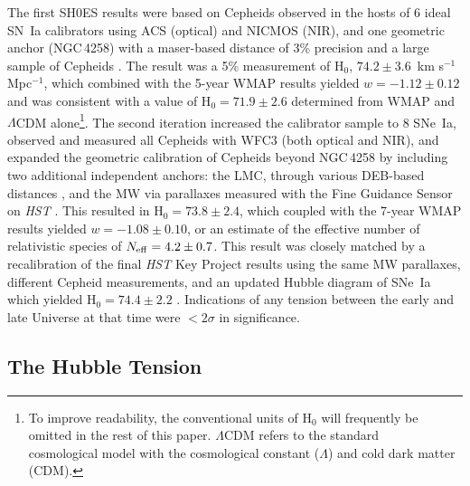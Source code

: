 \documentclass[12pt]{aastex631}
\newcommand{\kms}{km s$^{-1}$ Mpc$^{-1}$}
\begin{document}
The first SH0ES results \citep[][hereafter R09]{riess09a} were based on Cepheids observed in the hosts of 6 ideal SN~Ia calibrators using ACS (optical) and NICMOS (NIR), and one geometric anchor (NGC$\,$4258) with a maser-based distance of 3\% precision \citep{Humphreys13} and a large sample of Cepheids \citep{macri06}.  The result was a 5\% measurement of H$_0$, $74.2\pm3.6$~\kms, which combined with the 5-year WMAP results \citep{Komatsu:2009} yielded $w=-1.12\pm0.12$ and was consistent with a value of H$_0=71.9\pm2.6$ determined from WMAP and $\Lambda$CDM alone\footnote{To improve readability, the conventional units of H$_0$ will frequently be omitted in the rest of this paper. $\Lambda$CDM refers to the standard\\ cosmological model with the cosmological constant ($\Lambda$) and cold dark matter (CDM).}.  The second iteration \citep[][hereafter R11]{riess11} increased the calibrator sample to 8 SNe~Ia, observed and measured all Cepheids with WFC3 (both optical and NIR), and expanded the geometric calibration of Cepheids beyond NGC$\,$4258 by including two additional independent anchors: the LMC, through various DEB-based distances \citep[e.g.,][]{Pietrzynski:2009}, and the MW via parallaxes measured with the Fine Guidance Sensor on {\it HST} \citep{benedict07}. This resulted in H$_0=73.8\pm2.4$, which coupled with the 7-year WMAP results \citep{komatsu11} yielded $w=-1.08\pm0.10$, or an estimate of the effective number of relativistic species of $N_{\rm eff}=4.2\pm0.7$.  This result was closely matched by a recalibration of the final {\it HST} Key Project results using the same MW parallaxes, different Cepheid measurements, and an updated Hubble diagram of SNe~Ia which yielded H$_0=74.4\pm2.2$ \citep[][hereafter F12]{freedman12}.  Indications of any tension between the early and late Universe at that time were $<2\sigma$ in significance.

\subsection{The Hubble Tension}   
 
\end{document}
